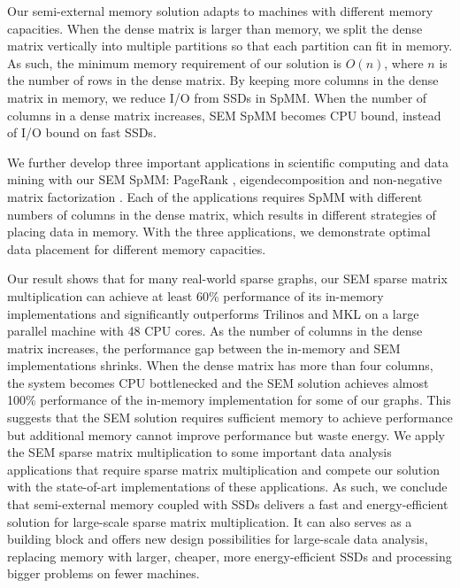 Our semi-external memory solution adapts to machines with different memory
capacities. When the dense matrix is larger than memory, we split the dense
matrix vertically into multiple partitions so that each partition can fit in
memory. As such, the minimum memory requirement of our solution is $O(n)$,
where $n$ is the number of rows in the dense matrix. By keeping more columns
in the dense matrix in memory, we reduce I/O from SSDs in SpMM. When the number
of columns in a dense matrix increases, SEM SpMM becomes CPU bound, instead of
I/O bound on fast SSDs.

We further develop three important applications in scientific computing and
data mining with our SEM SpMM: PageRank \cite{pagerank}, eigendecomposition
\cite{} and non-negative matrix factorization \cite{nmf}. Each of the applications
requires SpMM with different numbers of columns in the dense matrix, which
results in different strategies of placing data in memory.
With the three applications, we demonstrate optimal data placement for
different memory capacities.


Our result shows that for many real-world sparse graphs, our SEM sparse matrix
multiplication can achieve at least 60\% performance of its in-memory
implementations and significantly outperforms Trilinos \cite{trilinos} and
MKL \cite{mkl} on a large parallel machine with 48 CPU cores. As the number
of columns in
the dense matrix increases, the performance gap between the in-memory and
SEM implementations shrinks. When the dense matrix has more than four columns,
the system becomes CPU bottlenecked and the SEM solution achieves almost
100\% performance of the in-memory implementation for some of our graphs.
This suggests that the SEM solution requires sufficient memory to achieve
performance but additional memory cannot improve performance but waste energy.
We apply the SEM sparse matrix multiplication to some important
data analysis applications that require sparse matrix multiplication and compete
our solution with the state-of-art implementations of these applications.
 As such, we conclude that
semi-external memory coupled with SSDs delivers a fast and energy-efficient
solution for large-scale sparse matrix multiplication. It can also serves
as a building block and offers new design possibilities for large-scale
data analysis, replacing memory with larger, cheaper, more energy-efficient SSDs
and processing bigger problems on fewer machines.
